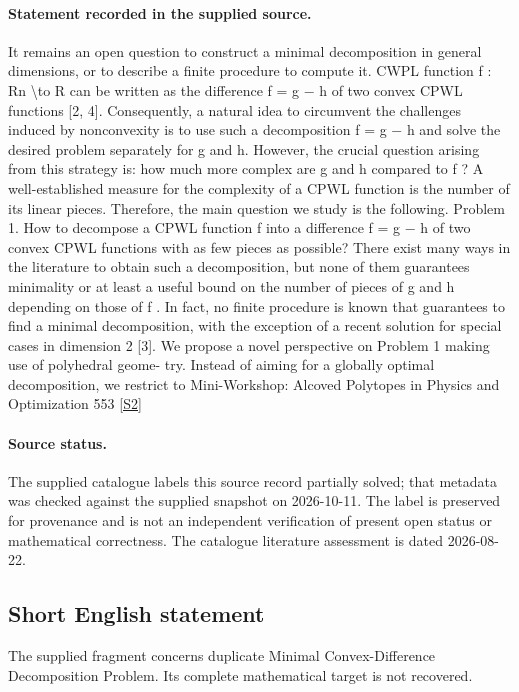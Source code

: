 \documentclass[11pt]{article}
\newcommand{\sref}[2]{\hyperlink{source:#1:#2}{[S#2]}}
\begin{document}
\paragraph{Statement recorded in the supplied source.}
It remains an open question to construct a minimal decomposition in general dimensions, or to describe a finite procedure to compute it. CWPL function f : Rn \textbackslash{}to R can be written as the difference f = g − h of two convex CPWL functions [2, 4]. Consequently, a natural idea to circumvent the challenges induced by nonconvexity is to use such a decomposition f = g − h and solve the desired problem separately for g and h. However, the crucial question arising from this strategy is: how much more complex are g and h compared to f ? A well-established measure for the complexity of a CPWL function is the number of its linear pieces. Therefore, the main question we study is the following. Problem 1. How to decompose a CPWL function f into a difference f = g − h of two convex CPWL functions with as few pieces as possible? There exist many ways in the literature to obtain such a decomposition, but none of them guarantees minimality or at least a useful bound on the number of pieces of g and h depending on those of f . In fact, no finite procedure is known that guarantees to find a minimal decomposition, with the exception of a recent solution for special cases in dimension 2 [3]. We propose a novel perspective on Problem 1 making use of polyhedral geome- try. Instead of aiming for a globally optimal decomposition, we restrict to Mini-Workshop: Alcoved Polytopes in Physics and Optimization 553 \sref{statement}{2}
\paragraph{Source status.}
The supplied catalogue labels this source record partially solved; that metadata was checked against the supplied snapshot on 2026-10-11. The label is preserved for provenance and is not an independent verification of present open status or mathematical correctness. The catalogue literature assessment is dated 2026-08-22.
\subsection{Short English statement}
The supplied fragment concerns duplicate Minimal Convex-Difference Decomposition Problem. Its complete mathematical target is not recovered.
\end{document}
